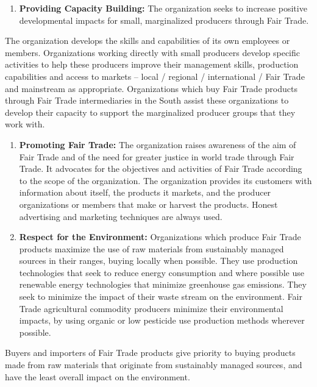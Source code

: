 \documentclass[]{book}
\providecommand{\tightlist}{%
  \setlength{\itemsep}{0pt}\setlength{\parskip}{0pt}}
\begin{document}
\begin{enumerate}
\def\labelenumi{\arabic{enumi}.}
\setcounter{enumi}{7}
\tightlist
\item
  \textbf{Providing Capacity Building:}
  The organization seeks to increase positive developmental impacts for small, marginalized producers through Fair Trade.
\end{enumerate}

The organization develops the skills and capabilities of its own employees or members. Organizations working directly with small producers develop specific activities to help these producers improve their management skills, production capabilities and access to markets -- local / regional / international / Fair Trade and mainstream as appropriate. Organizations which buy Fair Trade products through Fair Trade intermediaries in the South assist these organizations to develop their capacity to support the marginalized producer groups that they work with.

\begin{enumerate}
\def\labelenumi{\arabic{enumi}.}
\setcounter{enumi}{8}
\item
  \textbf{Promoting Fair Trade:}
  The organization raises awareness of the aim of Fair Trade and of the need for greater justice in world trade through Fair Trade. It advocates for the objectives and activities of Fair Trade according to the scope of the organization. The organization provides its customers with information about itself, the products it markets, and the producer organizations or members that make or harvest the products. Honest advertising and marketing techniques are always used.
\item
  \textbf{Respect for the Environment:}
  Organizations which produce Fair Trade products maximize the use of raw materials from sustainably managed sources in their ranges, buying locally when possible. They use production technologies that seek to reduce energy consumption and where possible use renewable energy technologies that minimize greenhouse gas emissions. They seek to minimize the impact of their waste stream on the environment. Fair Trade agricultural commodity producers minimize their environmental impacts, by using organic or low pesticide use production methods wherever possible.
\end{enumerate}

Buyers and importers of Fair Trade products give priority to buying products made from raw materials that originate from sustainably managed sources, and have the least overall impact on the environment.
\end{document}
